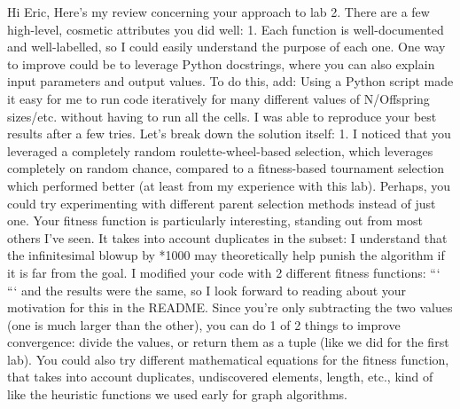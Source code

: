 Hi Eric,\markdownRendererInterblockSeparator
{}Here's my review concerning your approach to lab 2.\markdownRendererInterblockSeparator
{}There are a few high-level, cosmetic attributes you did well: 1. Each function is well-documented and well-labelled, so I could easily understand the purpose of each one. One way to improve could be to leverage Python docstrings, where you can also explain input parameters and output values. To do this, add:\markdownRendererInterblockSeparator
{}\markdownRendererInterblockSeparator
{}\markdownRendererOlBeginTight
{}Using a Python script made it easy for me to run code iteratively for many different values of N/Offspring sizes/etc. without having to run all the cells. I was able to reproduce your best results after a few tries.\markdownRendererOlItemEnd 
\markdownRendererOlEndTight \markdownRendererInterblockSeparator
{}Let's break down the solution itself: 1. I noticed that you leveraged a completely random roulette-wheel-based selection, which leverages completely on random chance, compared to a fitness-based tournament selection which performed better (at least from my experience with this lab). Perhaps, you could try experimenting with different parent selection methods instead of just one.\markdownRendererInterblockSeparator
{}\markdownRendererOlBeginTight
{}Your fitness function is particularly interesting, standing out from most others I've seen. It takes into account duplicates in the subset:\markdownRendererOlItemEnd 
\markdownRendererOlEndTight \markdownRendererInterblockSeparator
{}\markdownRendererInterblockSeparator
{}I understand that the infinitesimal blowup by \markdownRendererDollarSign{}*1000\markdownRendererDollarSign{} may theoretically help punish the algorithm if it is far from the goal. I modified your code with 2 different fitness functions:  ```\markdownRendererInterblockSeparator
{} ``` and the results were the same, so I look forward to reading about your motivation for this in the README. Since you're only subtracting the two values (one is much larger than the other), you can do 1 of 2 things to improve convergence: divide the values, or return them as a tuple (like we did for the first lab). You could also try different mathematical equations for the fitness function, that takes into account duplicates, undiscovered elements, length, etc., kind of like the heuristic functions we used early for graph algorithms.\markdownRendererInterblockSeparator

